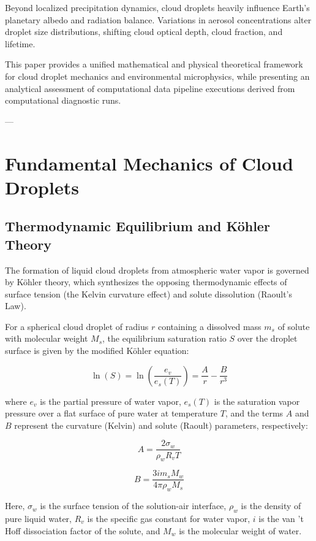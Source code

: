 \documentclass[12pt]{article}
\begin{document}
Beyond localized precipitation dynamics, cloud droplets heavily influence Earth's planetary albedo and radiation balance. Variations in aerosol concentrations alter droplet size distributions, shifting cloud optical depth, cloud fraction, and lifetime.

This paper provides a unified mathematical and physical theoretical framework for cloud droplet mechanics and environmental microphysics, while presenting an analytical assessment of computational data pipeline executions derived from computational diagnostic runs.

---

\section{Fundamental Mechanics of Cloud Droplets}

\subsection{Thermodynamic Equilibrium and Köhler Theory}
The formation of liquid cloud droplets from atmospheric water vapor is governed by Köhler theory, which synthesizes the opposing thermodynamic effects of surface tension (the Kelvin curvature effect) and solute dissolution (Raoult's Law).

For a spherical cloud droplet of radius $r$ containing a dissolved mass $m_s$ of solute with molecular weight $M_s$, the equilibrium saturation ratio $S$ over the droplet surface is given by the modified Köhler equation:

\begin{equation}
\ln(S) = \ln\left(\frac{e_v}{e_s(T)}\right) = \frac{A}{r} - \frac{B}{r^3}
\end{equation}

where $e_v$ is the partial pressure of water vapor, $e_s(T)$ is the saturation vapor pressure over a flat surface of pure water at temperature $T$, and the terms $A$ and $B$ represent the curvature (Kelvin) and solute (Raoult) parameters, respectively:

\begin{equation}
A = \frac{2 \sigma_w}{\rho_w R_v T}
\end{equation}

\begin{equation}
B = \frac{3 i m_s M_w}{4 \pi \rho_w M_s}
\end{equation}

Here, $\sigma_w$ is the surface tension of the solution-air interface, $\rho_w$ is the density of pure liquid water, $R_v$ is the specific gas constant for water vapor, $i$ is the van 't Hoff dissociation factor of the solute, and $M_w$ is the molecular weight of water.
\end{document}
